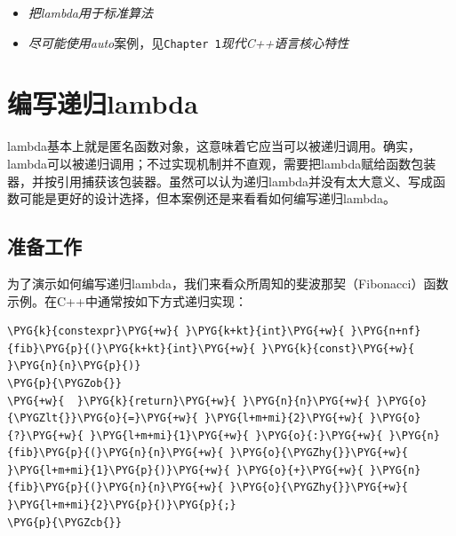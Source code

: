 
\begin{itemize}
\item \textit{把lambda用于标准算法}



\item \textit{尽可能使用auto}案例，见\texttt{Chapter 1}\textit{现代C++语言核心特性}

\end{itemize}



\section{编写递归lambda}



lambda基本上就是匿名函数对象，这意味着它应当可以被递归调用。确实，lambda可以被递归调用；不过实现机制并不直观，需要把lambda赋给函数包装器，并按引用捕获该包装器。虽然可以认为递归lambda并没有太大意义、写成函数可能是更好的设计选择，但本案例还是来看看如何编写递归lambda。



\subsection{准备工作}



为了演示如何编写递归lambda，我们来看众所周知的斐波那契（Fibonacci）函数示例。在C++中通常按如下方式递归实现：



\begin{codeblockbg}
\begin{Verbatim}[commandchars=\\\{\},breaklines=true,breakanywhere=true,fontsize=\codefont,xleftmargin=17bp]
\PYG{k}{constexpr}\PYG{+w}{ }\PYG{k+kt}{int}\PYG{+w}{ }\PYG{n+nf}{fib}\PYG{p}{(}\PYG{k+kt}{int}\PYG{+w}{ }\PYG{k}{const}\PYG{+w}{ }\PYG{n}{n}\PYG{p}{)}
\PYG{p}{\PYGZob{}}
\PYG{+w}{  }\PYG{k}{return}\PYG{+w}{ }\PYG{n}{n}\PYG{+w}{ }\PYG{o}{\PYGZlt{}}\PYG{o}{=}\PYG{+w}{ }\PYG{l+m+mi}{2}\PYG{+w}{ }\PYG{o}{?}\PYG{+w}{ }\PYG{l+m+mi}{1}\PYG{+w}{ }\PYG{o}{:}\PYG{+w}{ }\PYG{n}{fib}\PYG{p}{(}\PYG{n}{n}\PYG{+w}{ }\PYG{o}{\PYGZhy{}}\PYG{+w}{ }\PYG{l+m+mi}{1}\PYG{p}{)}\PYG{+w}{ }\PYG{o}{+}\PYG{+w}{ }\PYG{n}{fib}\PYG{p}{(}\PYG{n}{n}\PYG{+w}{ }\PYG{o}{\PYGZhy{}}\PYG{+w}{ }\PYG{l+m+mi}{2}\PYG{p}{)}\PYG{p}{;}
\PYG{p}{\PYGZcb{}}
\end{Verbatim}
\end{codeblockbg}


